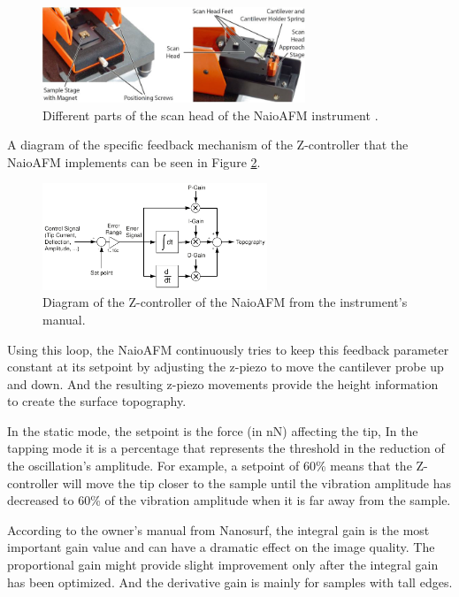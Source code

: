 \documentclass[11pt,a4paper]{article}
\begin{document}
\begin{figure}[hbt]
\centering
\includegraphics[width=0.7\textwidth]{naioafm2}
\caption{Different parts of the scan head of the NaioAFM instrument \cite{NaioAFM}.}
\label{fig:naioafm}
\end{figure}

A diagram of the specific feedback mechanism of the Z-controller that the NaioAFM implements can be seen in Figure \ref{fig:feedback_z-controller}.

\begin{figure}[hbt]
\centering
\includegraphics[width=0.6\textwidth]{Feedback_NaioAFM}
\caption{Diagram of the Z-controller of the NaioAFM from the instrument's manual.}
\label{fig:feedback_z-controller}
\end{figure}

Using this loop, the NaioAFM continuously tries to keep this feedback parameter constant at its setpoint by adjusting the z-piezo to move the cantilever probe up and down. And the resulting z-piezo movements provide the height information to create the surface topography.

In the static mode, the setpoint is the force (in \si{\nano \N}) affecting the tip, In the tapping mode it is a percentage that represents the threshold in the reduction of the oscillation's amplitude. For example, a setpoint of 60\% means that the Z-controller will move the tip closer to the sample until the vibration amplitude has decreased to 60\% of the vibration amplitude when it is far away from the sample.

According to the owner's manual from Nanosurf, the integral gain is the most important gain value and can have a dramatic effect on the image quality. The proportional gain might provide slight improvement only after the integral gain has been optimized. And the derivative gain is mainly for samples with tall edges.
\end{document}
